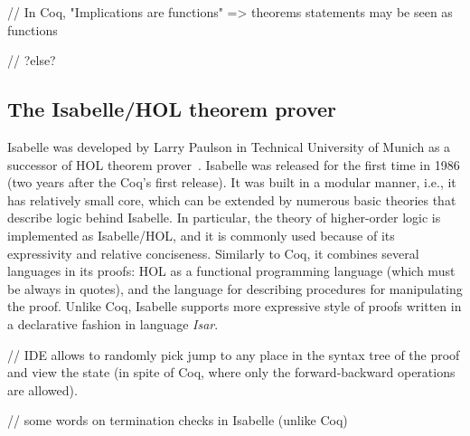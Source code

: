\documentclass[article]{aaltoseries}
\begin{document}

// In Coq, "Implications are functions" => theorems statements may be seen as functions

// ?else?




\subsection{The Isabelle/HOL theorem prover}
\label{sec:prover_isabelle}

Isabelle was developed by Larry Paulson in Technical University of Munich as a successor of HOL theorem prover~\cite{tool_HOL}. Isabelle was released for the first time in 1986 (two years after the Coq's first release). It was built in a modular manner, i.e., it has relatively small core, which can be extended by numerous basic theories that describe logic behind Isabelle. In particular, the theory of higher-order logic is implemented as Isabelle/HOL, and it is commonly used because of its expressivity and relative conciseness. Similarly to Coq, it combines several languages in its proofs: HOL as a functional programming language (which must be always in quotes), and the language for describing procedures for manipulating the proof. Unlike Coq, Isabelle supports more expressive style of proofs written in a declarative fashion in language \textit{Isar}.

// IDE allows to randomly pick jump to any place in the syntax tree of the proof and view the state (in spite of Coq, where only the forward-backward operations are allowed).


// some words on termination checks in Isabelle (unlike Coq)
\end{document}
